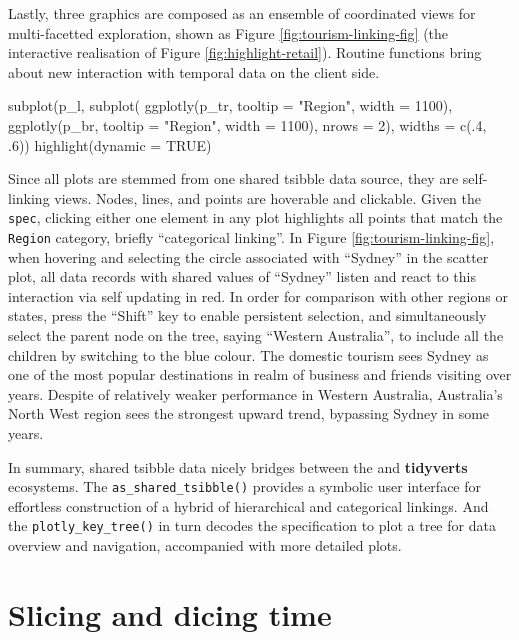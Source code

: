 Lastly, three graphics are composed as an ensemble of coordinated views
for multi-facetted exploration, shown as Figure
\ref{fig:tourism-linking-fig} (the interactive realisation of Figure
\ref{fig:highlight-retail}). Routine functions bring about new
interaction with temporal data on the client side.

\begin{Schunk}
\begin{Sinput}
subplot(p_l,
  subplot(
    ggplotly(p_tr, tooltip = "Region", width = 1100),
    ggplotly(p_br, tooltip = "Region", width = 1100),
    nrows = 2),
  widths = c(.4, .6)) %
  highlight(dynamic = TRUE)
\end{Sinput}
\end{Schunk}

Since all plots are stemmed from one shared tsibble data source, they
are self-linking views. Nodes, lines, and points are hoverable and
clickable. Given the \texttt{spec}, clicking either one element in any
plot highlights all points that match the \texttt{Region} category,
briefly ``categorical linking''. In Figure
\ref{fig:tourism-linking-fig}, when hovering and selecting the circle
associated with ``Sydney'' in the scatter plot, all data records with
shared values of ``Sydney'' listen and react to this interaction via
self updating in red. In order for comparison with other regions or
states, press the ``Shift'' key to enable persistent selection, and
simultaneously select the parent node on the tree, saying ``Western
Australia'', to include all the children by switching to the blue
colour. The domestic tourism sees Sydney as one of the most popular
destinations in realm of business and friends visiting over years.
Despite of relatively weaker performance in Western Australia,
Australia's North West region sees the strongest upward trend, bypassing
Sydney in some years.

In summary, shared tsibble data nicely bridges between the
 and \textbf{tidyverts} ecosystems. The
\texttt{as\_shared\_tsibble()} provides a symbolic user interface for
effortless construction of a hybrid of hierarchical and categorical
linkings. And the \texttt{plotly\_key\_tree()} in turn decodes the
specification to plot a tree for data overview and navigation,
accompanied with more detailed plots.

\hypertarget{slicing-and-dicing-time}{%
\section{Slicing and dicing time}\label{slicing-and-dicing-time}}

